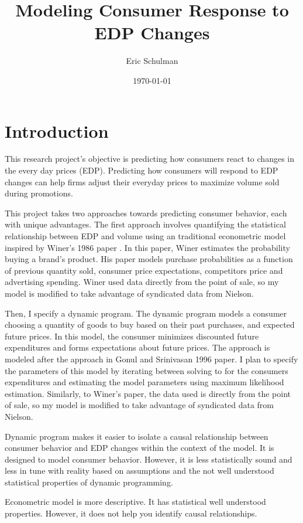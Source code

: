 \documentclass{article}
\title{Modeling Consumer Response to EDP Changes}
\author{Eric Schulman}
\date{\today}
\begin{document}
\maketitle

\section{Introduction}

This research project's objective is predicting how consumers react to changes in the every day prices (EDP). Predicting how consumers will respond to EDP changes can help firms adjust their everyday prices to maximize volume sold during promotions.

This project takes two approaches towards predicting consumer behavior, each with unique advantages. The first approach involves quantifying the statistical relationship between EDP and volume using an traditional econometric model inspired by Winer's 1986 paper \cite{winer}. In this paper, Winer estimates the probability buying a brand's product. His paper models purchase probabilities as a function of previous quantity sold, consumer price expectations, competitors price and advertising spending. Winer used data directly from the point of sale, so my model is modified to take advantage of syndicated data from Nielson.

Then, I specify a dynamic program. The dynamic program models a consumer choosing a quantity of goods to buy based on their past purchases, and expected future prices. In this model, the consumer minimizes discounted future expenditures and forms expectations about future prices. The approach is modeled after the approach in Gonul and Srinivasan 1996 paper\cite{gonul}. I plan to specify the parameters of this model by iterating between solving to for the consumers expenditures and estimating the model parameters using maximum likelihood estimation. Similarly, to Winer's paper,  the data used is directly from the point of sale, so my model is modified to take advantage of syndicated data from Nielson.

Dynamic program makes it easier to isolate a causal relationship between consumer behavior and EDP changes within the context of the model. It is designed to model consumer behavior. However, it is less statistically sound and less in tune with reality based on assumptions and the not well understood statistical properties of dynamic programming.

Econometric model is more descriptive. It has statistical well understood properties. However, it does not help you identify causal relationships.
\end{document}

